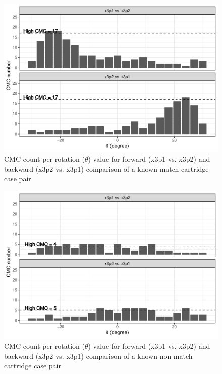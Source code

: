 \begin{Schunk}
\begin{figure}[htbp]

{\centering \includegraphics[width=.7\textwidth]{cmcR_files/figure-latex/unnamed-chunk-3-1} 

}

\caption{\label{fig:kmCMCPerTheta} CMC count per rotation ($\theta$) value for forward (x3p1 vs. x3p2) and backward (x3p2 vs. x3p1) comparison of a known match cartridge case pair}\label{fig:unnamed-chunk-3}
\end{figure}
\end{Schunk}

\begin{Schunk}
\begin{figure}[htbp]

{\centering \includegraphics[width=.7\textwidth]{cmcR_files/figure-latex/unnamed-chunk-4-1} 

}

\caption{\label{fig:knmCMCPerTheta} CMC count per rotation ($\theta$) value for forward (x3p1 vs. x3p2) and backward (x3p2 vs. x3p1) comparison of a known non-match cartridge case pair}\label{fig:unnamed-chunk-4}
\end{figure}
\end{Schunk}

